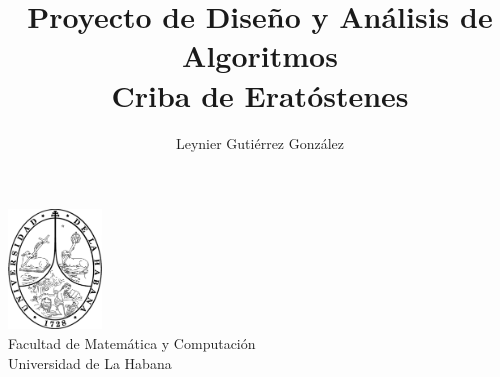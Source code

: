 \documentclass[12pt]{article}
\title{Proyecto de Diseño y Análisis de Algoritmos\\ \vspace{.2cm} \textbf{Criba de Eratóstenes}}
\author{Leynier Gutiérrez González}
\begin{document}
\maketitle

\vspace{0.5cm}

\begin{center}
	\vspace{0.2cm}
	\includegraphics[width=2.5cm]{images/escudo.png}\\
	\vspace{0.2cm}
	Facultad de Matemática y Computación\\
	\vspace{0.1cm}
	Universidad de La Habana\\
	\vspace{1cm}
\end{center}

\vspace{1cm}

\begin{abstract}
	
\end{abstract}

\newpage

\tableofcontents

\newpage
\end{document}

